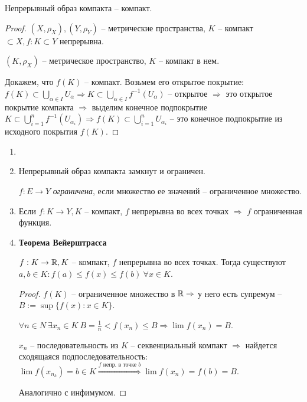 \begin{theorem}
    Непрерывный образ компакта – компакт.
\end{theorem}

\begin{proof}

     $(X, \rho_X), (Y,  \rho_Y)$ – метрические пространства, $K$ – компакт $\subset X, f:K\subset Y$ непрерывна.

     $(K, \rho_X)$ – метрическое пространство, $K$ – компакт в нем.

     Докажем, что $f(K)$ – компакт. Возьмем его открытое покрытие: $f(K)\subset\bigcup\limits_{\alpha\in I} U_\alpha\Rightarrow K\subset\bigcup\limits_{\alpha\in I} f^{-1}(U_\alpha)$  – открытое $\Rightarrow$ это открытое покрытие компакта $\Rightarrow$ выделим конечное подпокрытие $K\subset\bigcup\limits_{i=1}^n f^{-1}(U_{\alpha_i})\Rightarrow f(K)\subset\bigcup\limits_{i=1}^n U_{\alpha_i}$ – это конечное подпокрытие из исходного покрытия $f(K)$.     
\end{proof}

\begin{corollary}
    \begin{enumerate}
        \item[]
        \item Непрерывный образ компакта замкнут и ограничен.
    
    \begin{definition}
        $f:E\rightarrow Y$ \textit{ограничена}, если множество ее значений – ограниченное множество.
    \end{definition}

    \item Если $f:K\rightarrow Y, K$ – компакт, $f$ непрерывна во всех точках $\Rightarrow$ $f$ ограниченная функция.

    \item \textbf{Теорема Вейерштрасса}
    \begin{theorem}
         $f:K\rightarrow \mathbb{R}, K$ – компакт, $f$ непрерывна во всех точках. Тогда существуют $a, b\in K: f(a)\leq f(x)\leq f(b)\ \forall x\in K$.
    \end{theorem}

    \begin{proof}
        $f(K)$ – ограниченное множество в $\mathbb{R}\Rightarrow$ у него есть супремум – $B:=\sup\{f(x):x\in K\}$.

        $\forall n\in N\ \exists x_n\in K\ B=\frac{1}{n}<f(x_n)\leq B\Rightarrow \lim f(x_n)=B$.

        $x_n$ – последовательность из $K$ – секвенциальный компакт $\Rightarrow$ найдется сходящаяся подпоследовательность: $\lim f(x_{n_k})=b\in K\overset{f \text{ непр. в точке } b}{\Rightarrow}\lim f(x_n)=f(b)=B$.

        Аналогично с инфимумом.
    \end{proof}
    \end{enumerate}
\end{corollary}

